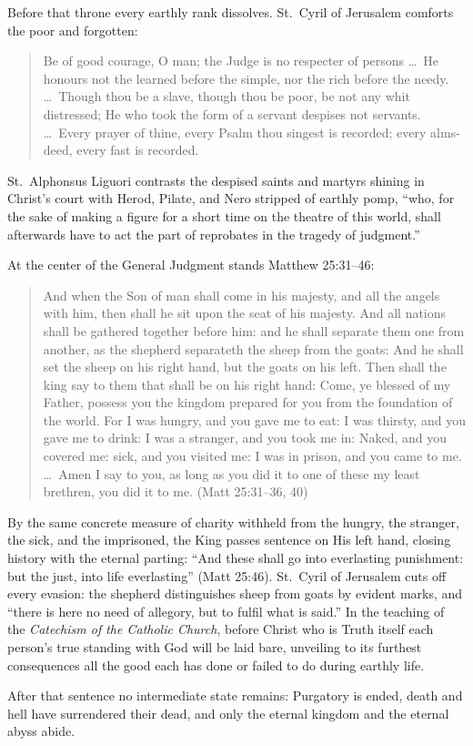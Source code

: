 Before that throne every earthly rank dissolves. St.\ Cyril of Jerusalem comforts the poor and forgotten:

\begin{quote}
Be of good courage, O man; the Judge is no respecter of persons \dots\ He honours not the learned before the simple, nor the rich before the needy. \dots\ Though thou be a slave, though thou be poor, be not any whit distressed; He who took the form of a servant despises not servants. \dots\ Every prayer of thine, every Psalm thou singest is recorded; every alms-deed, every fast is recorded.
\end{quote}

St.\ Alphonsus Liguori contrasts the despised saints and martyrs shining in Christ's court with Herod, Pilate, and Nero stripped of earthly pomp, ``who, for the sake of making a figure for a short time on the theatre of this world, shall afterwards have to act the part of reprobates in the tragedy of judgment.''

At the center of the General Judgment stands Matthew 25:31--46:

\begin{quote}
And when the Son of man shall come in his majesty, and all the angels with him, then shall he sit upon the seat of his majesty. And all nations shall be gathered together before him: and he shall separate them one from another, as the shepherd separateth the sheep from the goats: And he shall set the sheep on his right hand, but the goats on his left. Then shall the king say to them that shall be on his right hand: Come, ye blessed of my Father, possess you the kingdom prepared for you from the foundation of the world. For I was hungry, and you gave me to eat: I was thirsty, and you gave me to drink: I was a stranger, and you took me in: Naked, and you covered me: sick, and you visited me: I was in prison, and you came to me. \dots\ Amen I say to you, as long as you did it to one of these my least brethren, you did it to me. (Matt 25:31--36, 40)
\end{quote}

By the same concrete measure of charity withheld from the hungry, the stranger, the sick, and the imprisoned, the King passes sentence on His left hand, closing history with the eternal parting: ``And these shall go into everlasting punishment: but the just, into life everlasting'' (Matt 25:46). St.\ Cyril of Jerusalem cuts off every evasion: the shepherd distinguishes sheep from goats by evident marks, and ``there is here no need of allegory, but to fulfil what is said.'' In the teaching of the \textit{Catechism of the Catholic Church}, before Christ who is Truth itself each person's true standing with God will be laid bare, unveiling to its furthest consequences all the good each has done or failed to do during earthly life.

After that sentence no intermediate state remains: Purgatory is ended, death and hell have surrendered their dead, and only the eternal kingdom and the eternal abyss abide.
